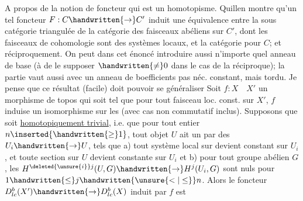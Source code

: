 \margin{\handwritten{\(\Vert\)}}%
A propos de la notion de foncteur qui est un homotopisme. Quillen montre qu'un tel foncteur $F:C\handwritten{\to}C'$ induit une équivalence entre la sous catégorie triangulée  de la catégorie  des faisceaux abéliens sur $C'$, dont les faisceaux de cohomologie sont des systèmes locaux, et la catégorie  pour $C$;  et réciproquement.  On peut dans cet énoncé introduire aussi n'importe quel anneau de base (à  de le supposer $\handwritten{\ne}0$ dans le cas de la réciproque);  la partie  vaut aussi avec un anneau de boefficients pas néc. constant, mais  tordu. Je pense que ce résultat (facile) doit pouvoir se généraliser  Soit $f:X\quad X'$ un morphisme de topos qui soit tel que pour tout  faisceau loc. const. sur $X'$, $f$ induise un isomorphisme sur les  (avec cas non commutatif inclus). Supposons que   soit \uline{ homotopiquement trivial}, i.e. que  pour tout entier $n\inserted{\handwritten{\geq}1}$, tout objet $U$  ait un  par des $U_i\handwritten{\to}U$, tels que a) tout système local sur  devient constant sur $U_i$, et toute section sur $U$ devient constante sur $U_i$ et b) pour tout  groupe abélien $G$, les $H^{\deleted{\unsure{i}}j}(U,G)\handwritten{\to}H^j(U_i,G)$ sont nuls pour $1\handwritten{\leq}j\handwritten{\unsure{<|\leq}}n$.%
 Alors le foncteur $D^b_{lc}(X')\handwritten{\to}D^b_{lc}(X)$ induit par $f$ est

